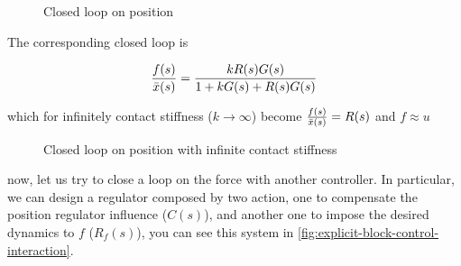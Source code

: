 \begin{figure}[htb]
	\centering
	\caption{Closed loop on position}
	\label{fig:closed-position-control-interaction}
\end{figure}

The corresponding closed loop is

\[
	\frac{f(s)}{\bar{x}(s)} = \frac{kR(s)G(s)}{1 + kG(s) + R(s)G(s)}
\]

which for infinitely contact stiffness ($k \to \infty$) become $\frac{f(s)}{\bar{x}(s)}=R(s)$ and $f \approx u$

\begin{figure}[htb]
	\centering
	\caption{Closed loop on position with infinite contact stiffness}
	\label{fig:stiffness-closed-position-control-interaction}
\end{figure}

now, let us try to close a loop on the force with another controller.
In particular, we can design a regulator composed by two action, one to compensate the position regulator influence ($C(s)$), and another one to impose the desired dynamics to $f$ ($R_f(s)$), you can see this system in \autoref{fig:explicit-block-control-interaction}.

